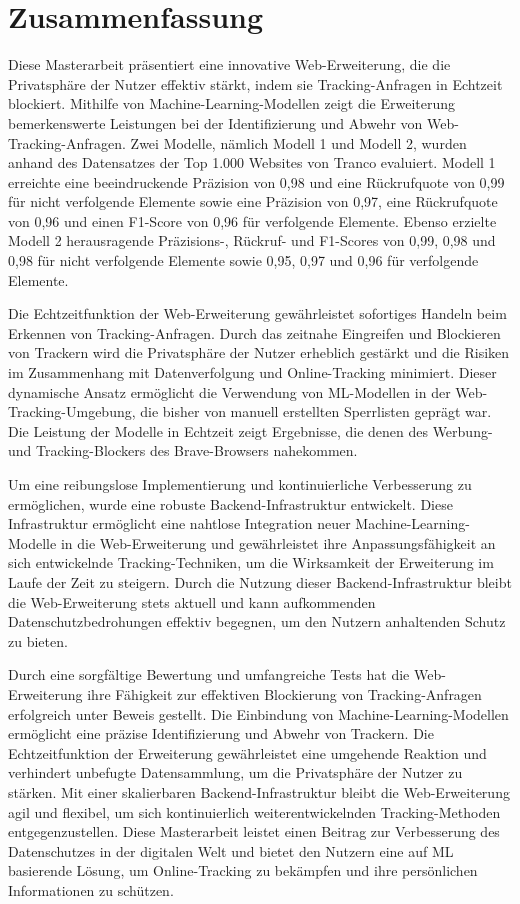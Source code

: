 \chapter*{Zusammenfassung}
\label{cha:zusammenfassung}


Diese Masterarbeit präsentiert eine innovative Web-Erweiterung, die die Privatsphäre der Nutzer effektiv stärkt,
indem sie Tracking-Anfragen in Echtzeit blockiert. Mithilfe von Machine-Learning-Modellen zeigt die Erweiterung
bemerkenswerte Leistungen bei der Identifizierung und Abwehr von Web-Tracking-Anfragen. Zwei Modelle, nämlich Modell 1
und Modell 2, wurden anhand des Datensatzes der Top 1.000 Websites von Tranco evaluiert. Modell 1 erreichte eine
beeindruckende Präzision von 0,98 und eine Rückrufquote von 0,99 für nicht verfolgende Elemente sowie eine Präzision
von 0,97, eine Rückrufquote von 0,96 und einen F1-Score von 0,96 für verfolgende Elemente. Ebenso erzielte Modell 2
herausragende Präzisions-, Rückruf- und F1-Scores von 0,99, 0,98 und 0,98 für nicht verfolgende Elemente sowie 0,95, 0,97
und 0,96 für verfolgende Elemente.

Die Echtzeitfunktion der Web-Erweiterung gewährleistet sofortiges Handeln beim Erkennen von Tracking-Anfragen. Durch
das zeitnahe Eingreifen und Blockieren von Trackern wird die Privatsphäre der Nutzer erheblich gestärkt und die Risiken
im Zusammenhang mit Datenverfolgung und Online-Tracking minimiert. Dieser dynamische Ansatz ermöglicht die Verwendung
von ML-Modellen in der Web-Tracking-Umgebung, die bisher von manuell erstellten Sperrlisten geprägt war. Die Leistung
der Modelle in Echtzeit zeigt Ergebnisse, die denen des Werbung- und Tracking-Blockers des Brave-Browsers nahekommen.

Um eine reibungslose Implementierung und kontinuierliche Verbesserung zu ermöglichen, wurde eine robuste Backend-Infrastruktur
entwickelt. Diese Infrastruktur ermöglicht eine nahtlose Integration neuer Machine-Learning-Modelle in die Web-Erweiterung
und gewährleistet ihre Anpassungsfähigkeit an sich entwickelnde Tracking-Techniken, um die Wirksamkeit der Erweiterung
im Laufe der Zeit zu steigern. Durch die Nutzung dieser Backend-Infrastruktur bleibt die Web-Erweiterung stets aktuell
und kann aufkommenden Datenschutzbedrohungen effektiv begegnen, um den Nutzern anhaltenden Schutz zu bieten.

Durch eine sorgfältige Bewertung und umfangreiche Tests hat die Web-Erweiterung ihre Fähigkeit zur effektiven Blockierung
von Tracking-Anfragen erfolgreich unter Beweis gestellt. Die Einbindung von Machine-Learning-Modellen ermöglicht eine
präzise Identifizierung und Abwehr von Trackern. Die Echtzeitfunktion der Erweiterung gewährleistet eine umgehende Reaktion
und verhindert unbefugte Datensammlung, um die Privatsphäre der Nutzer zu stärken. Mit einer skalierbaren Backend-Infrastruktur
bleibt die Web-Erweiterung agil und flexibel, um sich kontinuierlich weiterentwickelnden Tracking-Methoden entgegenzustellen.
Diese Masterarbeit leistet einen Beitrag zur Verbesserung des Datenschutzes in der digitalen Welt und bietet den Nutzern eine
auf ML basierende Lösung, um Online-Tracking zu bekämpfen und ihre persönlichen Informationen zu schützen.
